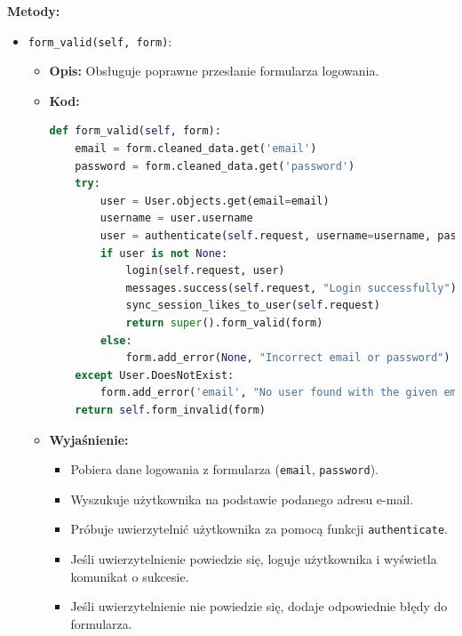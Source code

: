 \documentclass[12pt,a4paper,oneside]{article}
\theoremstyle{definition}
\numberwithin{equation}{section}
\begin{document}
   
\textbf{Metody:}
\begin{itemize}
    \item \texttt{form\_valid(self, form)}:
    \begin{itemize}
        \item \textbf{Opis:} Obsługuje poprawne przesłanie formularza logowania.
        \item \textbf{Kod:}
        \begin{lstlisting}[language=Python, caption=Metoda form\_valid w UserLoginView]
def form_valid(self, form):
    email = form.cleaned_data.get('email')
    password = form.cleaned_data.get('password')
    try:
        user = User.objects.get(email=email)
        username = user.username
        user = authenticate(self.request, username=username, password=password)
        if user is not None:
            login(self.request, user)
            messages.success(self.request, "Login successfully")
            sync_session_likes_to_user(self.request)
            return super().form_valid(form)
        else:
            form.add_error(None, "Incorrect email or password")
    except User.DoesNotExist:
        form.add_error('email', "No user found with the given email address")
    return self.form_invalid(form)
        \end{lstlisting}
        \item \textbf{Wyjaśnienie:}
        \begin{itemize}
            \item Pobiera dane logowania z formularza (\texttt{email}, \texttt{password}).
            \item Wyszukuje użytkownika na podstawie podanego adresu e-mail.
            \item Próbuje uwierzytelnić użytkownika za pomocą funkcji \texttt{authenticate}.
            \item Jeśli uwierzytelnienie powiedzie się, loguje użytkownika i wyświetla komunikat o sukcesie.
            \item Jeśli uwierzytelnienie nie powiedzie się, dodaje odpowiednie błędy do formularza.
        \end{itemize}
    \end{itemize}


\end{itemize}
\end{document}
